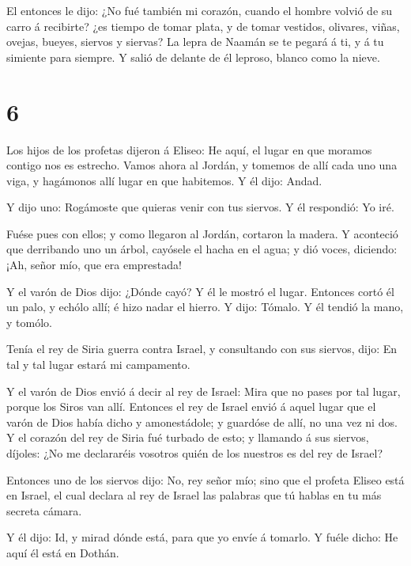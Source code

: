  El entonces le dijo: ¿No fué también mi corazón, cuando el
hombre volvió de su carro á recibirte? ¿es tiempo de tomar plata, y de
tomar vestidos, olivares, viñas, ovejas, bueyes, siervos y siervas?
 La lepra de Naamán se te pegará á ti, y á tu simiente para
siempre. Y salió de delante de él leproso, blanco como la nieve.

\hypertarget{section-5}{%
\section{6}\label{section-5}}

 Los hijos de los profetas dijeron á Eliseo: He aquí, el
lugar en que moramos contigo nos es estrecho.  Vamos ahora
al Jordán, y tomemos de allí cada uno una viga, y hagámonos allí lugar
en que habitemos. Y él dijo: Andad.

 Y dijo uno: Rogámoste que quieras venir con tus siervos. Y
él respondió: Yo iré.

 Fuése pues con ellos; y como llegaron al Jordán, cortaron
la madera.  Y aconteció que derribando uno un árbol,
cayósele el hacha en el agua; y dió voces, diciendo: ¡Ah, señor mío, que
era emprestada!

 Y el varón de Dios dijo: ¿Dónde cayó? Y él le mostró el
lugar. Entonces cortó él un palo, y echólo allí; é hizo nadar el hierro.
 Y dijo: Tómalo. Y él tendió la mano, y tomólo.

 Tenía el rey de Siria guerra contra Israel, y consultando
con sus siervos, dijo: En tal y tal lugar estará mi campamento.

 Y el varón de Dios envió á decir al rey de Israel: Mira que
no pases por tal lugar, porque los Siros van allí. 
Entonces el rey de Israel envió á aquel lugar que el varón de Dios había
dicho y amonestádole; y guardóse de allí, no una vez ni dos.
 Y el corazón del rey de Siria fué turbado de esto; y
llamando á sus siervos, díjoles: ¿No me declararéis vosotros quién de
los nuestros es del rey de Israel?

 Entonces uno de los siervos dijo: No, rey señor mío; sino
que el profeta Eliseo está en Israel, el cual declara al rey de Israel
las palabras que tú hablas en tu más secreta cámara.

 Y él dijo: Id, y mirad dónde está, para que yo envíe á
tomarlo. Y fuéle dicho: He aquí él está en Dothán.

